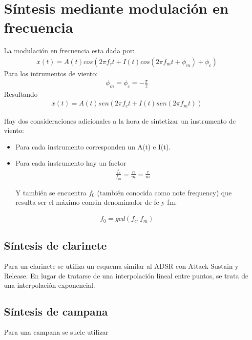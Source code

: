 \documentclass[assd_tp2_main.tex]{subfiles}
\begin{document}
\section{Síntesis mediante modulación en frecuencia}

La modulación en frecuencia esta dada por:
\begin{eqnarray*}
\textstyle x(t)=A(t)cos(2\pi f_c t+I(t)cos(2\pi f_mt+\phi_m)+\phi_c)
\end{eqnarray*}
Para los intrumentos de viento:
\begin{eqnarray*}
\displaystyle \phi_m=\phi_c=-\frac{\pi}{2}
\end{eqnarray*}
Resultando
\begin{eqnarray*}
\textstyle x(t)=A(t)sen(2\pi f_c t+I(t)sen(2\pi f_mt))
\end{eqnarray*}


Hay dos consideraciones adicionales a la hora de sintetizar un instrumento de viento:
\begin{itemize}
  \item Para cada instrumento corresponden un A(t) e I(t).

  \item Para cada instrumento hay un factor 
\begin{eqnarray*}
\displaystyle \frac{f_c}{f_m}=\frac{n}{m}=\frac{c}{m}
\end{eqnarray*}

Y también se encuentra $f_0$ (también conocida como note frequency) que resulta ser el máximo común denominador de fc y fm.
\end{itemize}

 
\begin{eqnarray*}
\displaystyle f_0=gcd(f_c,f_m)
\end{eqnarray*}
\subsection{Síntesis de clarinete}
Para un clarinete se utiliza un esquema similar al ADSR con Attack Sustain y Release. En lugar de tratarse de una interpolación lineal entre puntos, se trata de una interpolación exponencial.
\subsection{Síntesis de campana}
Para una campana se suele utilizar
\end{document}
